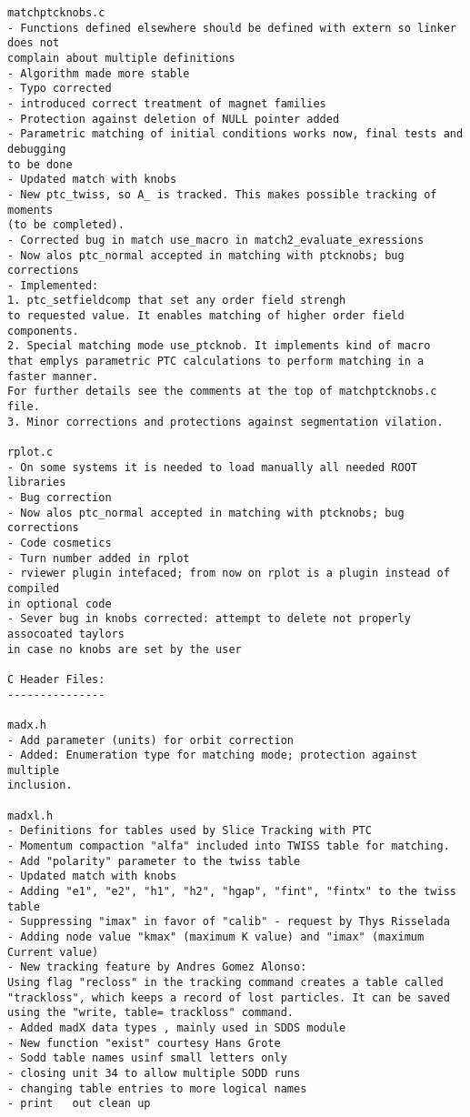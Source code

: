 \begin{verbatim}
matchptcknobs.c
- Functions defined elsewhere should be defined with extern so linker does not 
complain about multiple definitions
- Algorithm made more stable
- Typo corrected
- introduced correct treatment of magnet families
- Protection against deletion of NULL pointer added
- Parametric matching of initial conditions works now, final tests and debugging 
to be done
- Updated match with knobs
- New ptc_twiss, so A_ is tracked. This makes possible tracking of moments 
(to be completed).
- Corrected bug in match use_macro in match2_evaluate_exressions
- Now alos ptc_normal accepted in matching with ptcknobs; bug corrections
- Implemented:
1. ptc_setfieldcomp that set any order field strengh
to requested value. It enables matching of higher order field components.
2. Special matching mode use_ptcknob. It implements kind of macro
that emplys parametric PTC calculations to perform matching in a faster manner.
For further details see the comments at the top of matchptcknobs.c file.
3. Minor corrections and protections against segmentation vilation.

rplot.c
- On some systems it is needed to load manually all needed ROOT libraries
- Bug correction
- Now alos ptc_normal accepted in matching with ptcknobs; bug corrections
- Code cosmetics
- Turn number added in rplot
- rviewer plugin intefaced; from now on rplot is a plugin instead of compiled 
in optional code
- Sever bug in knobs corrected: attempt to delete not properly assocoated taylors 
in case no knobs are set by the user

C Header Files:
---------------

madx.h
- Add parameter (units) for orbit correction
- Added: Enumeration type for matching mode; protection against multiple 
inclusion.

madxl.h
- Definitions for tables used by Slice Tracking with PTC
- Momentum compaction "alfa" included into TWISS table for matching.
- Add "polarity" parameter to the twiss table
- Updated match with knobs
- Adding "e1", "e2", "h1", "h2", "hgap", "fint", "fintx" to the twiss table
- Suppressing "imax" in favor of "calib" - request by Thys Risselada
- Adding node value "kmax" (maximum K value) and "imax" (maximum Current value)
- New tracking feature by Andres Gomez Alonso:
Using flag "recloss" in the tracking command creates a table called
"trackloss", which keeps a record of lost particles. It can be saved
using the "write, table= trackloss" command.
- Added madX data types , mainly used in SDDS module
- New function "exist" courtesy Hans Grote
- Sodd table names usinf small letters only
- closing unit 34 to allow multiple SODD runs
- changing table entries to more logical names
- print   out clean up


\end{verbatim}
